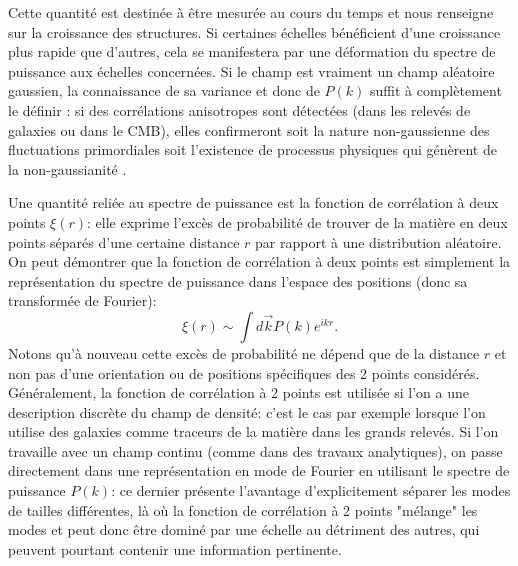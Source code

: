 Cette quantité est destinée à être mesurée au cours du temps et nous renseigne sur la croissance des structures. Si certaines échelles bénéficient d'une croissance plus rapide que d'autres, cela se manifestera par une déformation du spectre de puissance aux échelles concernées.  Si le champ est vraiment un champ aléatoire gaussien, la connaissance de sa variance et donc de $P(k)$ suffit à complètement le définir : si des corrélations anisotropes sont détectées (dans les relevés de galaxies ou dans le CMB), elles confirmeront soit la nature non-gaussienne des fluctuations primordiales soit l'existence de processus physiques qui génèrent de la non-gaussianité .

Une quantité reliée au spectre de puissance est la fonction de corrélation à deux points $\xi (r)$: elle exprime l'excès de probabilité de trouver de la matière en deux points séparés d'une certaine distance $r$ par rapport à une distribution aléatoire. On peut démontrer que la fonction de corrélation à deux points est simplement la représentation du spectre de puissance dans l'espace des positions (donc sa transformée de Fourier):
\begin{equation}
\xi (r)\sim \int d\vec k P(k) e^{i k r}.
\end{equation}
Notons qu'à nouveau cette excès de probabilité ne dépend que de la distance $r$ et non pas d'une orientation ou de positions spécifiques des 2 points considérés. Généralement, la fonction de corrélation à 2 points est utilisée si l'on a une description discrète du champ de densité: c'est le cas par exemple lorsque l'on utilise des galaxies comme traceurs de la matière dans les grands relevés. Si l'on travaille avec un champ continu (comme dans des travaux analytiques), on passe directement dans une représentation en mode de Fourier en utilisant le spectre de puissance $P(k)$: ce dernier présente l'avantage d'explicitement séparer les modes de tailles différentes, là où la fonction de corrélation à 2 points "mélange" les modes et peut donc être dominé par une échelle au détriment des autres, qui peuvent pourtant contenir une information pertinente.

